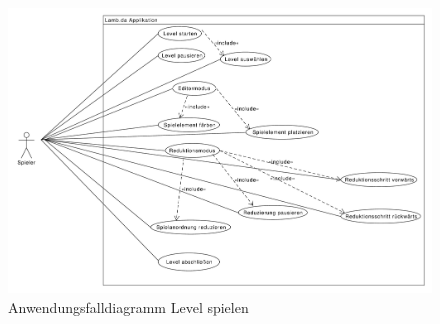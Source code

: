 \begin{figure}[H]
\centering
\includegraphics[scale=0.40]{../use_cases/play_level.pdf}
\caption{Anwendungsfalldiagramm Level spielen}
\end{figure}
